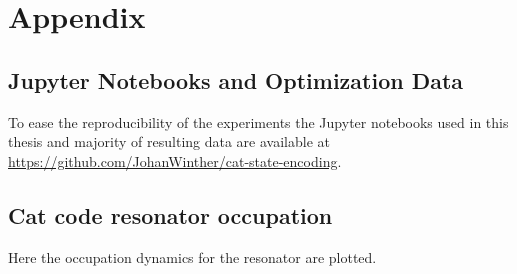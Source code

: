 \documentclass[main.tex]{subfiles}
\begin{document}
\chapter{Appendix}
\section{Jupyter Notebooks and Optimization Data}
To ease the reproducibility of the experiments the Jupyter notebooks used in this thesis and majority of resulting data are available at \url{https://github.com/JohanWinther/cat-state-encoding}.

\section{Cat code resonator occupation}
Here the occupation dynamics for the resonator are plotted.
\end{document}
